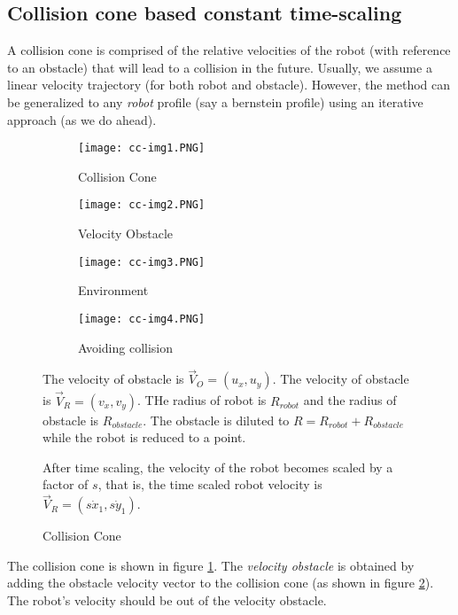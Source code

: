 
\subsection{Collision cone based constant time-scaling}

A collision cone is comprised of the relative velocities of the robot (with reference to an obstacle) that will lead to a collision in the future. Usually, we assume a linear velocity trajectory (for both robot and obstacle). However, the method can be generalized to any \emph{robot} profile (say a bernstein profile) using an iterative approach (as we do ahead).

\begin{figure}[ht]
    \begin{subfigure}[b]{0.24\textwidth}
        \texttt{[image: cc-img1.PNG]}
        \caption{Collision Cone}
        \label{fig:sfig-cc-cts}
    \end{subfigure}
    \begin{subfigure}[b]{0.24\textwidth}
        \texttt{[image: cc-img2.PNG]}
        \caption{Velocity Obstacle}
        \label{fig:sfig-vo-cts}
    \end{subfigure}
    \begin{subfigure}[b]{0.24\textwidth}
        \texttt{[image: cc-img3.PNG]}
        \caption{Environment}
        \label{fig:sfig-env-cts}
    \end{subfigure}
    \begin{subfigure}[b]{0.24\textwidth}
        \texttt{[image: cc-img4.PNG]}
        \caption{Avoiding collision}
        \label{fig:sfig-ac-cts}
    \end{subfigure}
    \caption{Collision Cone}
    \label{fig:cc-cts-imgs}
    \small
        The velocity of obstacle is $\overrightarrow{V}_{O} = (u_x, u_y)$. The velocity of obstacle is $\overrightarrow{V}_{R} = (v_x, v_y)$. THe radius of robot is $R_{robot}$ and the radius of obstacle is $R_{obstacle}$. The obstacle is diluted to $R = R_{robot} + R_{obstacle}$ while the robot is reduced to a point.

        After time scaling, the velocity of the robot becomes scaled by a factor of $s$, that is, the time scaled robot velocity is $\vec{V}_{R} = (s\dot{x}_1, s\dot{y}_1)$.
\end{figure}

The collision cone is shown in figure \ref{fig:sfig-cc-cts}. The \emph{velocity obstacle} is obtained by adding the obstacle velocity vector to the collision cone (as shown in figure \ref{fig:sfig-vo-cts}). The robot's velocity should be out of the velocity obstacle.


